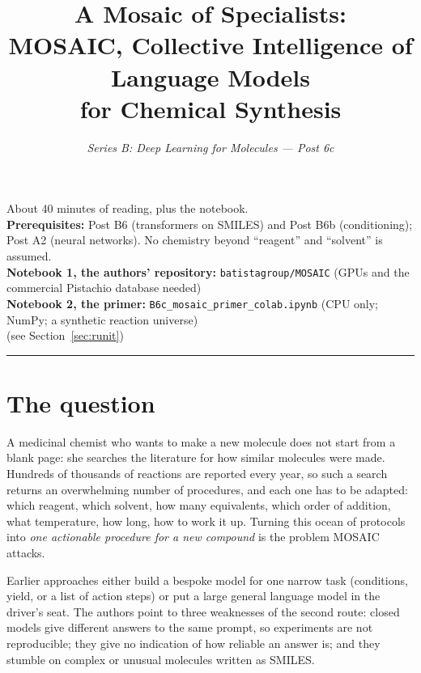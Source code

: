 \documentclass[11pt]{article}
\title{\textbf{A Mosaic of Specialists:}\\[0.2em]
       MOSAIC, Collective Intelligence of Language Models\\for Chemical Synthesis}
\author{\textit{Series B: Deep Learning for Molecules --- Post 6c}}
\date{}
\newcommand{\urlrepo}{https://github.com/batistagroup/MOSAIC}
\newcommand{\colaburlprimer}{https://colab.research.google.com/github/YOUR-USER/YOUR-REPO/blob/main/notebooks/B6c_mosaic_primer_colab.ipynb}
\newcommand{\colabbutton}[2]{%
  \href{#1}{\tcbox[on line,colback=orange!15,colframe=orange!70!black,boxrule=0.6pt,arc=3pt,
    left=4pt,right=4pt,top=1pt,bottom=1pt]{\small\textbf{$\blacktriangleright$ #2}}}}
\begin{document}
\maketitle
\thispagestyle{empty}

\begin{center}
\small
About 40 minutes of reading, plus the notebook.\\
\textbf{Prerequisites:} Post B6 (transformers on SMILES) and Post B6b (conditioning); Post A2 (neural networks). No chemistry beyond ``reagent'' and ``solvent'' is assumed.\\[0.5em]
\textbf{Notebook 1, the authors' repository:} \texttt{batistagroup/MOSAIC} (GPUs and the commercial Pistachio database needed)\\
\textbf{Notebook 2, the primer:} \texttt{B6c\_mosaic\_primer\_colab.ipynb} (CPU only; NumPy; a synthetic reaction universe)\\[0.4em]
\colabbutton{\urlrepo}{Open the repository}\quad
\colabbutton{\colaburlprimer}{Open the primer}\quad
{\footnotesize (see Section~\ref{sec:runit})}
\end{center}

\vspace{0.5em}
\hrule
\vspace{0.5em}

\section{The question}
A medicinal chemist who wants to make a new molecule does not start from a blank page: she searches the literature for how similar molecules were made. Hundreds of thousands of reactions are reported every year, so such a search returns an overwhelming number of procedures, and each one has to be adapted: which reagent, which solvent, how many equivalents, which order of addition, what temperature, how long, how to work it up. Turning this ocean of protocols into \emph{one actionable procedure for a new compound} is the problem MOSAIC attacks.

Earlier approaches either build a bespoke model for one narrow task (conditions, yield, or a list of action steps) or put a large general language model in the driver's seat. The authors point to three weaknesses of the second route: closed models give different answers to the same prompt, so experiments are not reproducible; they give no indication of how reliable an answer is; and they stumble on complex or unusual molecules written as SMILES.
\end{document}
